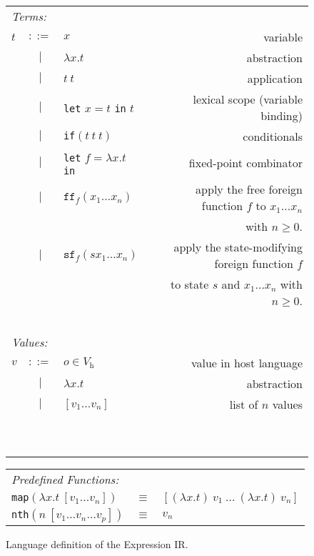\begin{figure}
    \begin{tabular}{l c l r}
        \multicolumn{4}{l}{\emph{Terms:}}\\
        $t$ & $::=$ & $x$ & variable\\
        & $|$ & $\lambda x.t$ & abstraction\\
        & $|$ & $t\ t$ & application\\
        & $|$ & \texttt{let} $x = t$ \texttt{in} $t$ & lexical scope (variable binding)\\
        & $|$ & \texttt{if}$(t\ t\ t)$ & conditionals\\
        & $|$ & \texttt{let} $f = \lambda x.t$ \texttt{in} & fixed-point combinator\\
        & $|$ & $\texttt{ff}_f (x_1 \dots x_n)$ & apply the free foreign function $f$ to $x_1 \dots x_n$\\
        &&& with $n \geq 0$.\\
        & $|$ & $\texttt{sf}_f (s x_1 \dots x_n)$ & apply the state-modifying foreign function $f$\\
        &&& to state $s$ and $x_1 \dots x_n$ with $n \geq 0$.\\\ \\
    
        \multicolumn{4}{l}{\emph{Values:}}\\
        $v$ & $::=$ & $o \in V_\text{h}$ & value in host language\\
        & $|$ & $\lambda x.t$ & abstraction\\
        & $|$ & $[ v_1 \dots v_n ]$ & list of $n$ values\\\ \\ \
    \end{tabular}
    
    \begin{tabular}{l c l}
        \multicolumn{3}{l}{\emph{Predefined Functions:}}\\
        \texttt{map}$(\lambda x.t\ [ v_1 \dots v_n ])$ & $\equiv$ & $[ (\lambda x.t)\ v_1\ \dots \ (\lambda x.t)\ v_n ]$\\
        \texttt{nth}$(n \ [ v_1 \dots v_n \dots v_p])$ & $\equiv$ & $v_n$
    \end{tabular}
    \caption{Language definition of the Expression IR.}%
    \label{fig:transformations:definition}
\end{figure}

